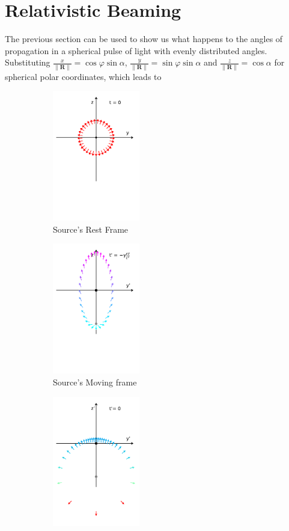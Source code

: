 \section{Relativistic Beaming}

The previous section can be used to show us what happens to the angles of propagation in a spherical pulse of light with evenly distributed angles. Substituting $\frac{x}{\|\mathbf{R}\|}= \cos{\varphi}\sin{\alpha}$, $\frac{y}{\|\mathbf{R}\|} = \sin{\varphi}\sin{\alpha}$ and $ \frac{z}{\|\mathbf{R}\|} = \cos{\alpha}$ for spherical polar coordinates, which leads to

\begin{figure}[H]
	\begin{subfigure}{.32\textwidth}
		\centering
		\includegraphics[width=3.8cm]{images/pdf/Rest_Pulse.pdf}
		\caption{Source's Rest Frame}
	\end{subfigure}
	\begin{subfigure}{.32\textwidth}
		\centering
		\includegraphics[width=3.8cm]{images/pdf/Prime_Pulse.pdf}
		\caption{Source's Moving frame}
	\end{subfigure}
	\begin{subfigure}{.32\textwidth}
		\centering
		\includegraphics[width=3.8cm]{images/pdf/Prime_Pulse_Simultaneous.pdf}

\end{subfigure}
\end{figure}
